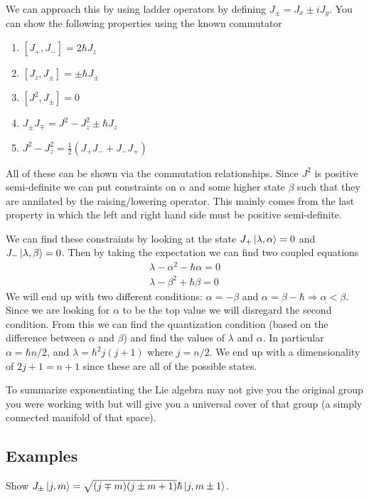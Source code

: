 We can approach this by using ladder operators by defining
$J_\pm = J_x \pm i J_y$. You can show the following properties
using the known commutator
\begin{enumerate}
    \item $\left[J_+, J_-\right] = 2 \hbar J_z$
    \item $\left[J_z, J_\pm\right] = \pm \hbar J_\pm$
    \item $\left[J^2, J_\pm\right] = 0$
    \item $J_\pm J_\mp = J^2 - J_z^2 \pm \hbar J_z$
    \item $J^2 - J_z^2 = \frac{1}{2} \left(J_+ J_- + J_- J_+\right)$
\end{enumerate}
All of these can be shown via the commutation relationships. Since $J^2$ is positive
semi-definite we can put constraints on $\alpha$ and some higher state $\beta$ such that
they are annilated by the raising/lowering operator. This mainly comes from the last
property in which the left and right hand side must be positive semi-definite. 

We can find these constraints by looking at the state
$J_+ \Ket{\lambda,\alpha} = 0$ and $J_- \Ket{\lambda,\beta} = 0$. Then by taking
the expectation we can find two coupled equations
\begin{align}
    \lambda - \alpha^2 -\hbar \alpha = 0 \\
    \lambda - \beta^2 + \hbar \beta = 0
\end{align}
We will end up with two different conditions: $\alpha = -\beta$ and
$\alpha = \beta - \hbar \Rightarrow \alpha < \beta$. Since we are looking
for $\alpha$ to be the top value we will disregard the second condition.
From this we can find the quantization condition (based on the difference
between $\alpha$ and $\beta$) and find the values of $\lambda$ and $\alpha$.
In particular $\alpha = \hbar n /2$, and $\lambda = \hbar^2 j(j+1)$ where
$j = n/2$. We end up with a dimensionality of $2j+1 = n+1$ since these are all
of the possible states. 

To summarize exponentiating the Lie algebra may not give you the original
group you were working with but will give you a universal cover of that group
(a simply connected manifold of that space).

\subsection{Examples}
Show $J_\pm \Ket{j,m} = \sqrt{(j\mp m)(j\pm m + 1)} \hbar \Ket{j,m\pm1}$.

